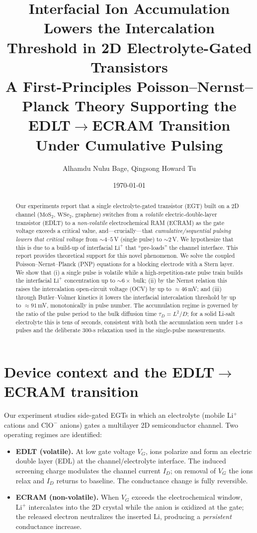 \documentclass[11pt,a4paper]{article}
\title{\textbf{Interfacial Ion Accumulation Lowers the Intercalation\\
Threshold in 2D Electrolyte-Gated Transistors}\\[4pt]
\large A First-Principles Poisson--Nernst--Planck Theory Supporting the\\
EDLT$\rightarrow$ECRAM Transition Under Cumulative Pulsing}
\author{Alhamdu Nuhu Bage, Qingsong Howard Tu}
\date{\today}
\newcommand{\Lip}{\ensuremath{\mathrm{Li^{+}}}}
\begin{document}
\maketitle

\begin{abstract}
\noindent
Our experiments report that a single electrolyte-gated transistor
(EGT) built on a 2D channel ($\mathrm{MoS_2}$, $\mathrm{WSe_2}$, graphene)
switches from a \emph{volatile} electric-double-layer transistor (EDLT) to a
\emph{non-volatile} electrochemical RAM (ECRAM) as the gate voltage exceeds a
critical value, and---crucially---that \emph{cumulative/sequential pulsing
lowers that critical voltage} from ${\sim}4$--$5$\,V (single pulse) to
${\sim}2$\,V. We hypothesize that this is due to a build-up of interfacial \Lip{}
that ``pre-loads'' the channel interface. This report provides theoretical support for this novel phenomenon. We solve the coupled Poisson--Nernst--Planck (PNP) equations for
a blocking electrode with a Stern layer. We show that (i) a single pulse is volatile while a high-repetition-rate
pulse train builds the interfacial \Lip{} concentration up to ${\sim}6\times$
bulk; (ii) by the Nernst relation this raises the intercalation open-circuit
voltage (OCV) by up to ${\approx}46$\,mV; and (iii)
through Butler--Volmer kinetics it lowers the interfacial intercalation
threshold by up to ${\approx}91$\,mV, monotonically in pulse number. The
accumulation regime is governed by the ratio of the pulse period to the bulk
diffusion time $\tau_D=L^2/D$; for a solid Li-salt electrolyte this is tens of
seconds, consistent with both the accumulation seen under $1$-s pulses and the
deliberate $300$-s relaxation used in the single-pulse measurements.
\end{abstract}

\section{Device context and the EDLT$\rightarrow$ECRAM transition}
Our experiment studies side-gated EGTs in which an electrolyte
(mobile \Lip{} cations and $\mathrm{ClO^{-}}$ anions) gates a multilayer 2D
semiconductor channel. Two operating regimes are identified:
\begin{itemize}
\item \textbf{EDLT (volatile).} At low gate voltage $V_G$, ions polarize and form
an electric double layer (EDL) at the channel/electrolyte interface. The induced
screening charge modulates the channel current $I_D$; on removal of $V_G$ the
ions relax and $I_D$ returns to baseline. The conductance change is fully
reversible.
\item \textbf{ECRAM (non-volatile).} When $V_G$ exceeds
the electrochemical window, \Lip{} intercalates into the 2D crystal while the
anion is oxidized at the gate; the released electron neutralizes the inserted Li,
producing a \emph{persistent} conductance increase.
\end{itemize}
\end{document}
